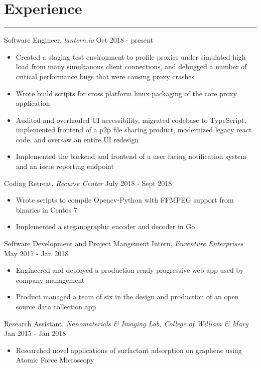 \documentclass[12pt]{article}
\begin{document}
\section*{Experience}
\vspace{-0.25cm}
\hrule
\vspace{0.25cm}

\noindent Software Engineer, \textit{lantern.io} \hfill Oct 2018 - present
\vspace{-0.1cm}
\begin{itemize}
  \itemsep-0.4em
\item Created a staging test environment to profile proxies under simulated high load from many simultanous client connections, and debugged a number of critical performance bugs that were causing proxy crashes
\item Wrote build scripts for cross platform linux packaging of the core proxy application
\item Audited and overhauled UI accessibility, migrated codebase to TypeScript, implemented frontend of a p2p file sharing product, modernized legacy react code, and oversaw an entire UI redesign
\item Implemented the backend and frontend of a user facing notification system and an issue reporting endpoint
\end{itemize}


\noindent Coding Retreat, \textit{Recurse Center} \hfill July 2018 - Sept 2018
\vspace{-0.1cm}
\begin{itemize}
  \itemsep-0.4em
	\item Wrote scripts to compile Opencv-Python with FFMPEG support from binaries in Centos 7
        \item Implemented a steganographic encoder and decoder in Go
\end{itemize}

\noindent Software Development and Project Mangement Intern, \textit{Enventure Enterprises} \hfill May 2017 - Jan 2018
\vspace{-0.1cm}
\begin{itemize}
  \itemsep-0.4em
	\item Engineered and deployed a production ready progressive web app used by company management
	\item Product managed a team of six in the design and production of an open source data collection app
\end{itemize}

\noindent Research Assistant, \textit{Nanomaterials \& Imaging Lab, College of William \& Mary} \hfill Jan 2015 - Jan 2018
\vspace{-0.1cm}
\begin{itemize}
  \itemsep-0.4em
	\item Researched novel applications of surfactant adsorption on graphene using Atomic Force Microscopy
\end{itemize}
\end{document}
